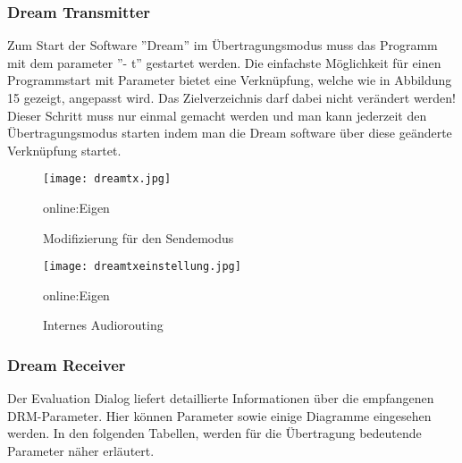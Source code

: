 \subsubsection{Dream Transmitter}
\label{subsubsec:dreamtx}
Zum Start der Software ”Dream” im Übertragungsmodus muss das Programm mit dem parameter ”- t” gestartet werden. Die einfachste Möglichkeit für einen Programmstart mit Parameter bietet eine Verknüpfung, welche wie in Abbildung 15 gezeigt, angepasst wird. Das Zielverzeichnis darf dabei nicht verändert werden! Dieser Schritt muss nur einmal gemacht werden und man kann jederzeit den Übertragungsmodus starten indem man die Dream software über diese geänderte Verknüpfung startet.

\begin{figure}[H]
	\centering
	\texttt{[image: dreamtx.jpg]}
	\caption[Modifizierung für den Sendemodus]{Modifizierung für den Sendemodus} \gls{online:Eigen}
	\label{fig:dreamtx}
\end{figure}

\begin{figure}[H]
	\centering
	\texttt{[image: dreamtxeinstellung.jpg]}
	\caption[Internes Audiorouting]{Internes Audiorouting} \gls{online:Eigen}
	\label{fig:dreamtxeinstellung}
\end{figure}

\subsubsection{Dream Receiver}
\label{subsec:Unterabschnitt12}

Der Evaluation Dialog liefert detaillierte Informationen über die empfangenen DRM-Parameter. Hier können Parameter sowie einige Diagramme eingesehen werden. In den folgenden Tabellen, werden für die Übertragung bedeutende Parameter näher erläutert.

